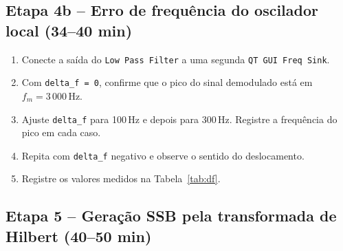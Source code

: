 \documentclass[11pt,a4paper]{article}
\begin{document}
\subsection*{Etapa 4b -- Erro de frequência do oscilador local (34--40 min)}

\begin{instrucao}
\begin{enumerate}[label=\arabic*.]
  \item Conecte a saída do \texttt{Low Pass Filter} a uma segunda
    \texttt{QT GUI Freq Sink}.
  \item Com \texttt{delta\_f = 0}, confirme que o pico do sinal demodulado
    está em $f_m = 3\,000$\,Hz.
  \item Ajuste \texttt{delta\_f} para 100\,Hz e depois para 300\,Hz. Registre
    a frequência do pico em cada caso.
  \item Repita com \texttt{delta\_f} negativo e observe o sentido do
    deslocamento.
  \item Registre os valores medidos na Tabela~\ref{tab:df}.
\end{enumerate}
\end{instrucao}

\subsection*{Etapa 5 -- Geração SSB pela transformada de Hilbert (40--50 min)}
\end{document}
